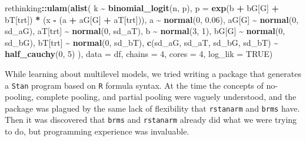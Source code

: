 \documentclass[11pt, oneside, openany]{scrbook}
\newenvironment{Shaded}{\begin{snugshade}}{\end{snugshade}}
\newcommand{\AttributeTok}[1]{\textcolor[rgb]{0.13,0.29,0.53}{#1}}
\newcommand{\ConstantTok}[1]{\textcolor[rgb]{0.56,0.35,0.01}{#1}}
\newcommand{\DecValTok}[1]{\textcolor[rgb]{0.00,0.00,0.81}{#1}}
\newcommand{\FloatTok}[1]{\textcolor[rgb]{0.00,0.00,0.81}{#1}}
\newcommand{\FunctionTok}[1]{\textcolor[rgb]{0.13,0.29,0.53}{\textbf{#1}}}
\newcommand{\NormalTok}[1]{#1}
\newcommand{\SpecialCharTok}[1]{\textcolor[rgb]{0.81,0.36,0.00}{\textbf{#1}}}
\begin{document}

\begin{Shaded}
\begin{Highlighting}[]
\NormalTok{rethinking}\SpecialCharTok{::}\FunctionTok{ulam}\NormalTok{(}\FunctionTok{alist}\NormalTok{(}
\NormalTok{  k }\SpecialCharTok{\textasciitilde{}} \FunctionTok{binomial\_logit}\NormalTok{(n, p),}
  \AttributeTok{p =} \FunctionTok{exp}\NormalTok{(b }\SpecialCharTok{+}\NormalTok{ bG[G] }\SpecialCharTok{+}\NormalTok{ bT[trt]) }\SpecialCharTok{*}\NormalTok{ (x }\SpecialCharTok{{-}}\NormalTok{ (a }\SpecialCharTok{+}\NormalTok{ aG[G] }\SpecialCharTok{+}\NormalTok{ aT[trt])),}
\NormalTok{  a }\SpecialCharTok{\textasciitilde{}} \FunctionTok{normal}\NormalTok{(}\DecValTok{0}\NormalTok{, }\FloatTok{0.06}\NormalTok{),}
\NormalTok{  aG[G] }\SpecialCharTok{\textasciitilde{}} \FunctionTok{normal}\NormalTok{(}\DecValTok{0}\NormalTok{, sd\_aG),}
\NormalTok{  aT[trt] }\SpecialCharTok{\textasciitilde{}} \FunctionTok{normal}\NormalTok{(}\DecValTok{0}\NormalTok{, sd\_aT),}
\NormalTok{  b }\SpecialCharTok{\textasciitilde{}} \FunctionTok{normal}\NormalTok{(}\DecValTok{3}\NormalTok{, }\DecValTok{1}\NormalTok{),}
\NormalTok{  bG[G] }\SpecialCharTok{\textasciitilde{}} \FunctionTok{normal}\NormalTok{(}\DecValTok{0}\NormalTok{, sd\_bG),}
\NormalTok{  bT[trt] }\SpecialCharTok{\textasciitilde{}} \FunctionTok{normal}\NormalTok{(}\DecValTok{0}\NormalTok{, sd\_bT),}
  \FunctionTok{c}\NormalTok{(sd\_aG, sd\_aT, sd\_bG, sd\_bT) }\SpecialCharTok{\textasciitilde{}} \FunctionTok{half\_cauchy}\NormalTok{(}\DecValTok{0}\NormalTok{, }\DecValTok{5}\NormalTok{)}
\NormalTok{), }\AttributeTok{data =}\NormalTok{ df, }\AttributeTok{chains =} \DecValTok{4}\NormalTok{, }\AttributeTok{cores =} \DecValTok{4}\NormalTok{, }\AttributeTok{log\_lik =} \ConstantTok{TRUE}\NormalTok{)}
\end{Highlighting}
\end{Shaded}


While learning about multilevel models, we tried writing a package that generates a \texttt{Stan} program based on \texttt{R} formula syntax. At the time the concepts of no-pooling, complete pooling, and partial pooling were vaguely understood, and the package was plagued by the same lack of flexibility that \texttt{rstanarm} and \texttt{brms} have. Then it was discovered that \texttt{brms} and \texttt{rstanarm} already did what we were trying to do, but programming experience was invaluable.
\end{document}
